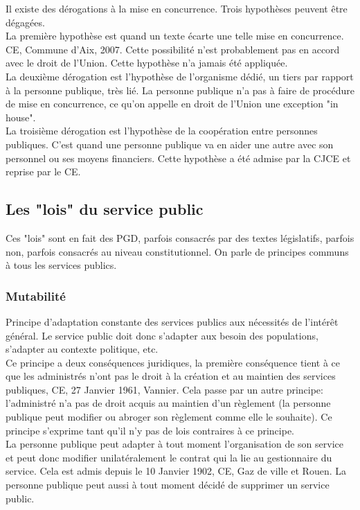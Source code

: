 \documentclass[10pt, a4paper, openany]{book}
\begin{document}
Il existe des dérogations à la mise en concurrence. Trois hypothèses peuvent être dégagées. \\
La première hypothèse est quand un texte écarte une telle mise en concurrence. CE, Commune d'Aix, 2007. Cette possibilité n'est probablement pas en accord avec le droit de l'Union. Cette hypothèse n'a jamais été appliquée. \\
La deuxième dérogation est l'hypothèse de l'organisme dédié, un tiers par rapport à la personne publique, très lié. La personne publique n'a pas à faire de procédure de mise en concurrence, ce qu'on appelle en droit de l'Union une exception "in house". \\
La troisième dérogation est l'hypothèse de la coopération entre personnes publiques. C'est quand une personne publique va en aider une autre avec son personnel ou ses moyens financiers. Cette hypothèse a été admise par la CJCE et reprise par le CE. 

\subsection{Les "lois" du service public}

Ces "lois" sont en fait des PGD, parfois consacrés par des textes législatifs, parfois non, parfois consacrés au niveau constitutionnel. On parle de principes communs à tous les services publics. 

\subsubsection{Mutabilité}

Principe d'adaptation constante des services publics aux nécessités de l'intérêt général. Le service public doit donc s'adapter aux besoin des populations, s'adapter au contexte politique, etc. \\
Ce principe a deux conséquences juridiques, la première conséquence tient à ce que les administrés n'ont pas le droit à la création et au maintien des services publiques, CE, 27 Janvier 1961, Vannier. Cela passe par un autre principe: l'administré n'a pas de droit acquis au maintien d'un règlement (la personne publique peut modifier ou abroger son règlement comme elle le souhaite). Ce principe s'exprime tant qu'il n'y pas de lois contraires à ce principe. \\
La personne publique peut adapter à tout moment l'organisation de son service et peut donc modifier unilatéralement le contrat qui la lie au gestionnaire du service. Cela est admis depuis le 10 Janvier 1902, CE, Gaz de ville et Rouen. La personne publique peut aussi à tout moment décidé de supprimer un service public.  
\end{document}
